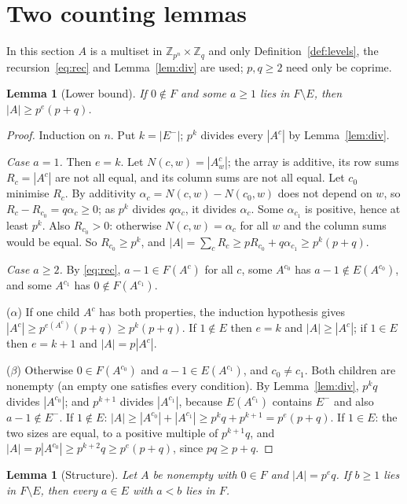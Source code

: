 \documentclass[11pt,a4paper]{amsart}
\newtheorem{lemma}[theorem]{Lemma}
\theoremstyle{definition}
\theoremstyle{remark}
\newcommand{\Z}{\mathbb{Z}}
\begin{document}
\section{Two counting lemmas}\label{sec:count}

In this section $A$ is a multiset in $\Z_{p^n}\times\Z_q$ and only Definition~\ref{def:levels}, the
recursion~\eqref{eq:rec} and Lemma~\ref{lem:div} are used; $p,q\ge2$ need only be coprime.

\begin{lemma}[Lower bound]\label{lem:three}
If $0\notin F$ and some $a\ge1$ lies in $F\setminus E$, then $|A|\ge p^{e}(p+q)$.
\end{lemma}

\begin{proof}
Induction on $n$. Put $k=|E^-|$; $p^k$ divides every $|A^c|$ by Lemma~\ref{lem:div}.

\emph{Case $a=1$.} Then $e=k$. Let $N(c,w)=|A^c_w|$; the array is additive, its row sums $R_c=|A^c|$ are not
all equal, and its column sums are not all equal. Let $c_0$ minimise $R_c$. By additivity
$\alpha_c=N(c,w)-N(c_0,w)$ does not depend on $w$, so $R_c-R_{c_0}=q\alpha_c\ge0$; as $p^k$ divides
$q\alpha_c$, it divides $\alpha_c$. Some $\alpha_{c_1}$ is positive, hence at least $p^k$. Also $R_{c_0}>0$:
otherwise $N(c,w)=\alpha_c$ for all $w$ and the column sums would be equal. So $R_{c_0}\ge p^k$, and
$|A|=\sum_cR_c\ge pR_{c_0}+q\alpha_{c_1}\ge p^k(p+q)$.

\emph{Case $a\ge2$.} By \eqref{eq:rec}, $a-1\in F(A^c)$ for all $c$, some $A^{c_0}$ has $a-1\notin E(A^{c_0})$,
and some $A^{c_1}$ has $0\notin F(A^{c_1})$.

($\alpha$) If one child $A^c$ has both properties, the induction hypothesis gives
$|A^c|\ge p^{e(A^c)}(p+q)\ge p^k(p+q)$. If $1\notin E$ then $e=k$ and $|A|\ge|A^c|$; if $1\in E$ then $e=k+1$
and $|A|=p|A^c|$.

($\beta$) Otherwise $0\in F(A^{c_0})$ and $a-1\in E(A^{c_1})$, and $c_0\ne c_1$. Both children are nonempty
(an empty one satisfies every condition). By Lemma~\ref{lem:div}, $p^kq$ divides $|A^{c_0}|$; and
$p^{k+1}$ divides $|A^{c_1}|$, because $E(A^{c_1})$ contains $E^-$ and also $a-1\notin E^-$. If $1\notin E$:
$|A|\ge|A^{c_0}|+|A^{c_1}|\ge p^kq+p^{k+1}=p^e(p+q)$. If $1\in E$: the two sizes are equal, to a positive
multiple of $p^{k+1}q$, and $|A|=p|A^{c_0}|\ge p^{k+2}q\ge p^{e}(p+q)$, since $pq\ge p+q$.
\end{proof}

\begin{lemma}[Structure]\label{lem:four}
Let $A$ be nonempty with $0\in F$ and $|A|=p^{e}q$. If $b\ge1$ lies in $F\setminus E$, then every $a\in E$
with $a<b$ lies in $F$.
\end{lemma}
\end{document}

